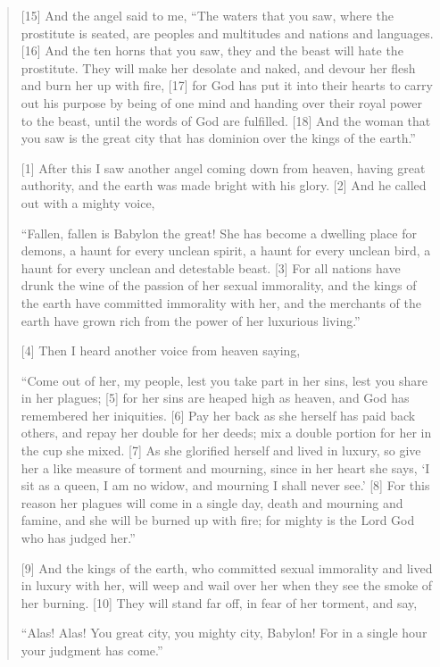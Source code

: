 \begin{quote}
    [15] And the angel said to me, “The waters that you saw, where the prostitute is seated, are peoples and multitudes and nations and languages. [16] And the ten horns that you saw, they and the beast will hate the prostitute. They will make her desolate and naked, and devour her flesh and burn her up with fire, [17] for God has put it into their hearts to carry out his purpose by being of one mind and handing over their royal power to the beast, until the words of God are fulfilled. [18] And the woman that you saw is the great city that has dominion over the kings of the earth.”

    [1] After this I saw another angel coming down from heaven, having great authority, and the earth was made bright with his glory. [2] And he called out with a mighty voice,

    “Fallen, fallen is Babylon the great!
        She has become a dwelling place for demons,
    a haunt for every unclean spirit,
        a haunt for every unclean bird,
        a haunt for every unclean and detestable beast.
    [3] For all nations have drunk
        the wine of the passion of her sexual immorality,
    and the kings of the earth have committed immorality with her,
        and the merchants of the earth have grown rich from the power of her luxurious living.”


    [4] Then I heard another voice from heaven saying,

    “Come out of her, my people,
        lest you take part in her sins,
    lest you share in her plagues;
    [5] for her sins are heaped high as heaven,
        and God has remembered her iniquities.
    [6] Pay her back as she herself has paid back others,
        and repay her double for her deeds;
        mix a double portion for her in the cup she mixed.
    [7] As she glorified herself and lived in luxury,
        so give her a like measure of torment and mourning,
    since in her heart she says,
        ‘I sit as a queen,
    I am no widow,
        and mourning I shall never see.’
    [8] For this reason her plagues will come in a single day,
        death and mourning and famine,
    and she will be burned up with fire;
        for mighty is the Lord God who has judged her.”


    [9] And the kings of the earth, who committed sexual immorality and lived in luxury with her, will weep and wail over her when they see the smoke of her burning. [10] They will stand far off, in fear of her torment, and say,

    “Alas! Alas! You great city,
        you mighty city, Babylon!
    For in a single hour your judgment has come.”



\end{quote}

